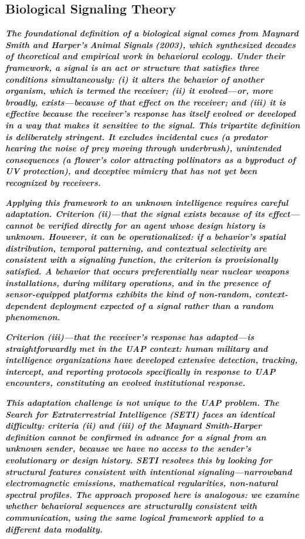 \documentclass[11pt,letterpaper]{article}
\begin{document}
\subsection{Biological Signaling Theory}

\textbf{\textit{The foundational definition of a biological signal comes from Maynard Smith and Harper's }}\textbf{\textit{Animal Signals}}\textbf{\textit{ (2003), which synthesized decades of theoretical and empirical work in behavioral ecology. Under their framework, a signal is an act or structure that satisfies three conditions simultaneously: (i) it alters the behavior of another organism, which is termed the receiver; (ii) it evolved---or, more broadly, exists---because of that effect on the receiver; and (iii) it is effective because the receiver's response has itself evolved or developed in a way that makes it sensitive to the signal. This tripartite definition is deliberately stringent. It excludes incidental cues (a predator hearing the noise of prey moving through underbrush), unintended consequences (a flower's color attracting pollinators as a byproduct of UV protection), and deceptive mimicry that has not yet been recognized by receivers.}}


\textbf{\textit{Applying this framework to an unknown intelligence requires careful adaptation. Criterion (ii)---that the signal exists because of its effect---cannot be verified directly for an agent whose design history is unknown. However, it can be operationalized: if a behavior's spatial distribution, temporal patterning, and contextual selectivity are consistent with a signaling function, the criterion is provisionally satisfied. A behavior that occurs preferentially near nuclear weapons installations, during military operations, and in the presence of sensor-equipped platforms exhibits the kind of non-random, context-dependent deployment expected of a signal rather than a random phenomenon.}}


\textbf{\textit{Criterion (iii)---that the receiver's response has adapted---is straightforwardly met in the UAP context: human military and intelligence organizations have developed extensive detection, tracking, intercept, and reporting protocols specifically in response to UAP encounters, constituting an evolved institutional response.}}


\textbf{\textit{This adaptation challenge is not unique to the UAP problem. The Search for Extraterrestrial Intelligence (SETI) faces an identical difficulty: criteria (ii) and (iii) of the Maynard Smith-Harper definition cannot be confirmed in advance for a signal from an unknown sender, because we have no access to the sender's evolutionary or design history. SETI resolves this by looking for structural features consistent with intentional signaling---narrowband electromagnetic emissions, mathematical regularities, non-natural spectral profiles. The approach proposed here is analogous: we examine whether behavioral sequences are structurally consistent with communication, using the same logical framework applied to a different data modality.}}
\end{document}
